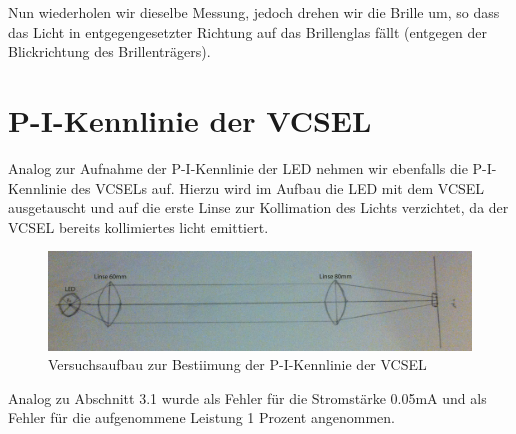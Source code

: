 \documentclass[bigchapter,colorback,accentcolor=tud4b,linedtoc,11pt]{tudreport}
\begin{document}
Nun wiederholen wir dieselbe Messung, jedoch drehen wir die Brille um, so dass das Licht in entgegengesetzter Richtung auf das Brillenglas fällt (entgegen der Blickrichtung des Brillenträgers).

\begin{center}
\begin{figure}[H]
\end{figure}
\end{center}

\section{P-I-Kennlinie der VCSEL}

Analog zur Aufnahme der P-I-Kennlinie der LED nehmen wir ebenfalls die P-I-Kennlinie des VCSELs auf. Hierzu wird im Aufbau die LED mit dem VCSEL ausgetauscht und auf die erste Linse zur Kollimation des Lichts verzichtet, da der VCSEL bereits kollimiertes licht emittiert.

\begin{figure}[ht!]
\centering
\includegraphics[width=150mm]{img/skizzen/versuch_a.jpg}
\caption{Versuchsaufbau zur Bestiimung der P-I-Kennlinie der VCSEL}
\label{PI-Kennlinie-VCSEL}
\end{figure}

Analog zu Abschnitt 3.1 wurde als Fehler für die Stromstärke 0.05mA und als Fehler für die aufgenommene Leistung 1 Prozent angenommen.
\end{document}
